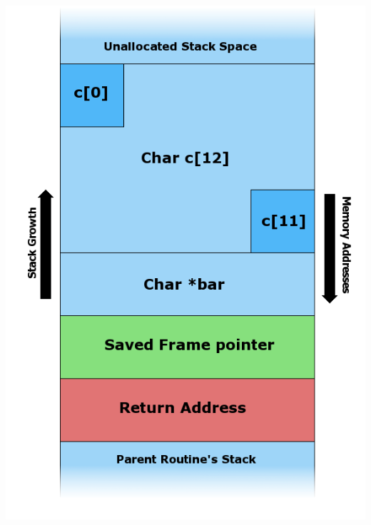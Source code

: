 \documentclass[usenames,dvipsnames]{beamer}
\begin{document}
\begin{frame}
\centering
\includegraphics[scale=0.16]{Stack_Overflow_2.png}

\end{frame}
\end{document}

